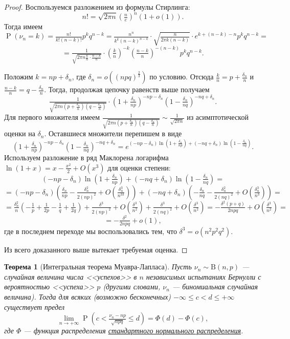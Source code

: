 \documentclass[12pt]{article}
\newtheorem{theorem}{Теорема}
\numberwithin{theorem}{section}
\theoremstyle{definition}
\newcommand{\prob}{\operatorname{P}}
\begin{document}
	\begin{proof}
		Воспользуемся разложением из формулы Стирлинга:
		$$ n! = \sqrt{2\pi n} \left(\tfrac{n}{e}\right)^n(1 + o(1)). $$
		Тогда имеем
		$$ \prob(\nu_n = k) = \tfrac{n!}{k!(n - k)!}p^kq^{n - k}
		= 
		\tfrac{n^n}{k^k (n - k)^{n - k}} \cdot \sqrt{\tfrac{n}{2\pi k(n - k)}} \cdot e^{k + (n - k) - n} p^k q^{n-k} = $$
		$$ = \tfrac{1}{\sqrt{2\pi n \tfrac{k}{n}\cdot\tfrac{n - k}{n}}} 
		\cdot \left(\tfrac{k}{n}\right)^{-k}\left(\tfrac{n - k}{n}\right)^{-(n - k)}p^k q^{n-k}. $$
		
		Положим $ k = np + \delta_n $, где $ \delta_n = o\left((npq)^{\tfrac{2}{3}}\right)  $ по условию.
		Отсюда $ \tfrac{k}{n} = p + \tfrac{\delta_n}{n} $ и $ \tfrac{n - k}{n} = q - \tfrac{\delta_n}{n} $.
		Тогда, продолжая цепочку равенств выше получаем
		$$ \tfrac{1}{\sqrt{2\pi n (p + \tfrac{\delta_n}{n})(q - \tfrac{\delta_n}{n})}} 
		\cdot \left(1 + \tfrac{\delta_n}{np}\right)^{-np - \delta_n}\left(1 - \tfrac{\delta_n}{nq}\right)^{-nq + \delta_n}. $$
		Для первого множителя имеем 
		$ \tfrac{1}{\sqrt{2\pi n (p + \tfrac{\delta_n}{n})(q - \tfrac{\delta_n}{n})}} \sim \tfrac{1}{\sqrt{2\pi n}} $
		из асимптотической оценки на $ \delta_n $.
		Оставшиеся множители перепишем в виде
		$$ \left(1 + \tfrac{\delta_n}{np}\right)^{-np - \delta_n}\left(1 - \tfrac{\delta_n}{nq}\right)^{-nq + \delta_n}
		= e^{(-np - \delta_n)\ln(1 + \tfrac{\delta_n}{np}) + (-nq + \delta_n)\ln(1 - \tfrac{\delta_n}{nq})}. $$
		Используем разложение в ряд Маклорена логарифма $ \ln(1 + x) = x - \tfrac{x^2}{2} + O(x^3) $ для
		оценки степени:
		$$ (-np - \delta_n)\ln(1 + \tfrac{\delta_n}{np}) + (-nq + \delta_n)\ln(1 - \tfrac{\delta_n}{nq}) = $$ 
		$$ = (-np - \delta_n)(\tfrac{\delta_n}{np} - \tfrac{\delta_n^2}{2(np)^2} + O(\tfrac{\delta_n^3}{n^33}))
		+ (-nq + \delta_n)(-\tfrac{\delta_n}{nq} - \tfrac{\delta_n^2}{2(nq)^2} + O(\tfrac{\delta_n^3}{n^3}))
		= $$
		$$ = \tfrac{\delta_n^2}{n}(-\tfrac{1}{p} + \tfrac{1}{2p} - \tfrac{1}{q} + \tfrac{1}{2q})
		+ \tfrac{\delta^3}{2(np)^2} + O(\tfrac{\delta^3}{n^2}) + \tfrac{\delta^3}{2(nq)^2} + O(\tfrac{\delta^3}{n^2})
		= -\tfrac{\delta^2(p + q)}{2npq} + O(\tfrac{\delta^3}{n^2}) = $$ 
		$$ = -\tfrac{\delta^2}{2npq} + o(1), $$
		где в последнем переходе мы воспользовались тем, что $ \delta^3 = o(n^2p^2q^2) $.
		
		Из всего доказанного выше вытекает требуемая оценка.
	\end{proof}
	
	\begin{theorem}[Интегральная теорема Муавра-Лапласа] \label{integral Muarve Laplas}
		Пусть $ \nu_n \sim \mathrm{B}(n, p) $ --- случайная величина числа <<успехов>> в $ n $ независимых испытаниях Бернулли
		с вероятностью <<успеха>> $ p $ (другими словами, $ \nu_n $ --- биномиальная случайная величина).
		Тогда для всяких (возможно бесконечных) $ -\infty \leqslant c < d \leqslant +\infty $ 
		существует предел
		$$ \lim\limits_{n \to +\infty} \prob(c < \tfrac{\nu_n - np}{\sqrt{npq}} \leqslant d) = \Phi(d) - \Phi(c), $$
		где $ \Phi $ --- функция распределения \hyperlink{standard-normal-distribution}{стандартного нормального распределения}.
	\end{theorem}
	
\end{document}
